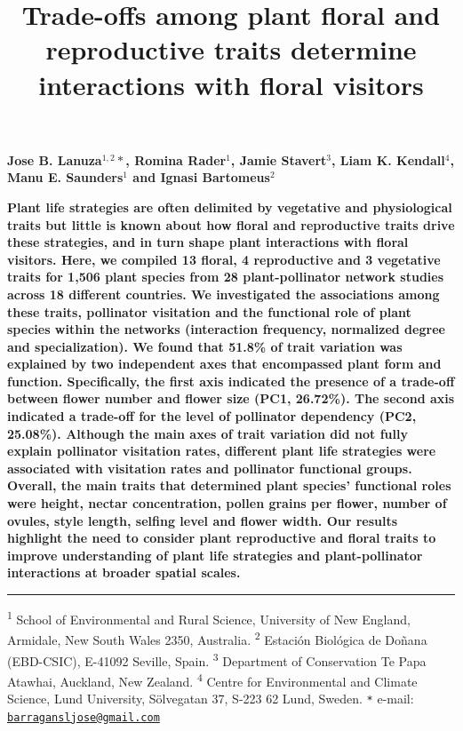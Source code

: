 \documentclass[12pt,a4paper,]{article}
\title{\singlespacing \vspace{-1.5cm} \LARGE Trade-offs among plant floral and
reproductive traits determine interactions with floral visitors}
\author{}
\date{\vspace{-2.5em}}
\begin{document}
\maketitle

\vspace{-2.2cm} \singlespacing
\large 
\textbf{Jose B. Lanuza$^{1,2}*$, Romina Rader$^{1}$, Jamie Stavert$^{3}$, Liam K. Kendall$^{4}$, Manu E. Saunders$^{1}$ and Ignasi Bartomeus$^{2}$}

\normalsize

\textbf{Plant life strategies are often delimited by vegetative and
physiological traits but little is known about how floral and
reproductive traits drive these strategies, and in turn shape plant
interactions with floral visitors. Here, we compiled 13 floral, 4
reproductive and 3 vegetative traits for 1,506 plant species from 28
plant-pollinator network studies across 18 different countries. We
investigated the associations among these traits, pollinator visitation
and the functional role of plant species within the networks
(interaction frequency, normalized degree and specialization). We found
that 51.8\% of trait variation was explained by two independent axes
that encompassed plant form and function. Specifically, the first axis
indicated the presence of a trade-off between flower number and flower
size (PC1, 26.72\%). The second axis indicated a trade-off for the level
of pollinator dependency (PC2, 25.08\%). Although the main axes of trait
variation did not fully explain pollinator visitation rates, different
plant life strategies were associated with visitation rates and
pollinator functional groups. Overall, the main traits that determined
plant species' functional roles were height, nectar concentration,
pollen grains per flower, number of ovules, style length, selfing level
and flower width. Our results highlight the need to consider plant
reproductive and floral traits to improve understanding of plant life
strategies and plant-pollinator interactions at broader spatial scales.}

\small
\vspace{-0.5cm}

\noindent\rule{\textwidth}{1pt}

\textsuperscript{1} School of Environmental and Rural Science,
University of New England, Armidale, New South Wales 2350, Australia.
\textsuperscript{2} Estación Biológica de Doñana (EBD-CSIC), E-41092
Seville, Spain. \textsuperscript{3} Department of Conservation
\textbar{} Te Papa Atawhai, Auckland, New Zealand. \textsuperscript{4}
Centre for Environmental and Climate Science, Lund University,
Sölvegatan 37, S-223 62 Lund, Sweden. \texttt{*} e-mail:
\href{mailto:barragansljose@gmail.com}{\nolinkurl{barragansljose@gmail.com}}
\end{document}
